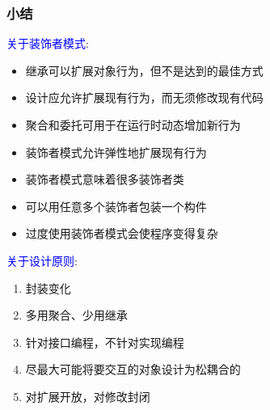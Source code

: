 \documentclass[compress]{beamer}
\begin{document}
\begin{frame}
  \frametitle{小结}
   {
    \textcolor{blue}{关于装饰者模式}: 
    \begin{itemize}
      \item 继承可以扩展对象行为，但不是达到的最佳方式
      \item 设计应允许扩展现有行为，而无须修改现有代码
      \item 聚合和委托可用于在运行时动态增加新行为
      \item 装饰者模式允许弹性地扩展现有行为
      \item 装饰者模式意味着很多装饰者类
      \item 可以用任意多个装饰者包装一个构件
      \item 过度使用装饰者模式会使程序变得复杂
  \end{itemize}
  }
   {
    \textcolor{blue}{关于设计原则}: 
    \begin{enumerate}
      \item 封装变化
      \item 多用聚合、少用继承
      \item 针对接口编程，不针对实现编程
      \item 尽最大可能将要交互的对象设计为松耦合的
      \item 对扩展开放，对修改封闭
    \end{enumerate}
  }
\end{frame}
\end{document}
